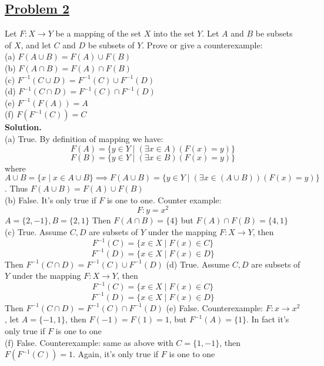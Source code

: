 \documentclass[10pt,letterpaper]{article}
\begin{document}
	\subsection*{{\color{purple}\underline{Problem 2}}}
	Let $F: X \rightarrow Y$ be a mapping of the set $X$ into the set $Y$. Let $A$ and $B$ be subsets of $X$, and let 
	$C$ and $D$ be subsets of $Y$. Prove or give a counterexample: \\
	(a) $F(A \cup B) = F(A) \cup F(B)$ \\
	(b) $F(A \cap B) = F(A) \cap F(B)$ \\
	(c) $F^{-1}(C \cup D) = F^{-1}(C) \cup F^{-1}(D)$ \\
	(d) $F^{-1}(C \cap D) = F^{-1}(C) \cap F^{-1}(D)$ \\
	(e) $F^{-1}(F(A)) = A$ \\
	(f) $F(F^{-1}(C)) = C$ \\
	
	\textbf{Solution.} \\
	(a) True. By definition of mapping we have:
	$$F(A) = \{ y \in Y \mid (\exists x \in A)(F(x) = y) \}$$
	$$F(B) = \{ y \in Y \mid (\exists x \in B)(F(x) = y) \}$$
	where $A \cup B = \{x \mid x \in A \cup B\} \implies F(A \cup B) = \{ y \in Y \mid (\exists x \in (A \cup B))(F(x) = y) \}$.
	Thus $F(A \cup B) = F(A) \cup F(B)$ \\
	(b) False. It's only true if $F$ is one to one. Counter example:
	$$F: y = x^2$$
	$A = \{2, -1\}, B = \{2, 1\}$
	Then $F(A \cap B) = \{4\}$ but $F(A) \cap F(B) = \{4, 1\}$ \\
	(c) True. Assume $C, D$ are subsets of $Y$ under the mapping $F: X \rightarrow Y$, then
	$$F^{-1}(C) = \{x \in X \mid F(x) \in C\}$$
	$$F^{-1}(D) = \{x \in X \mid F(x) \in D\}$$
	Then $F^{-1}(C \cap D) = F^{-1}(C) \cup F^{-1}(D)$
	(d) True. Assume $C, D$ are subsets of $Y$ under the mapping $F: X \rightarrow Y$, then
	$$F^{-1}(C) = \{x \in X \mid F(x) \in C\}$$
	$$F^{-1}(D) = \{x \in X \mid F(x) \in D\}$$
	Then $F^{-1}(C \cap D) = F^{-1}(C) \cap F^{-1}(D)$
	(e) False. Counterexample: $F : x \rightarrow x^2$, let $A = \{-1, 1\}$, then $F(-1) = F(1) = 1$, but
	$F^{-1}(A) = \{1\}$. In fact it's only true if $F$ is one to one\\
	(f) False. Counterexample: same as above with $C = \{1, -1\}$, then $F(F^{-1}(C)) = {1}$. Again, it's only
	true if $F$ is one to one
	
\end{document}
